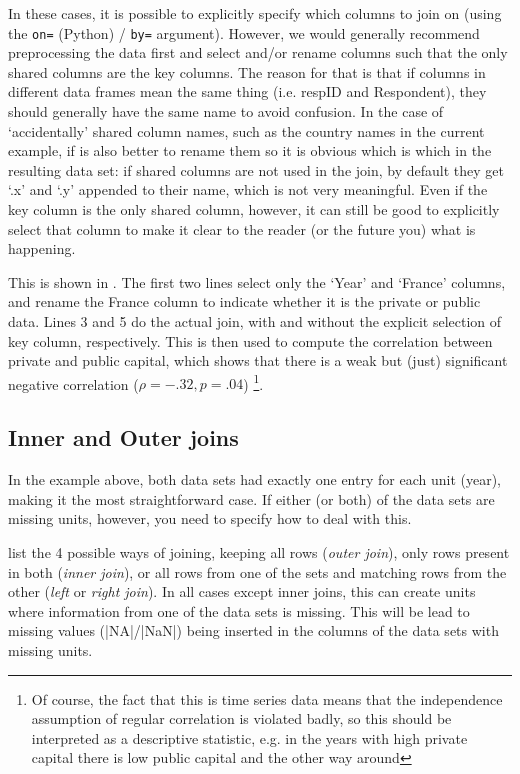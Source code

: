 In these cases, it is possible to explicitly specify which columns to join on (using the \verb+on=+ (Python) / \verb+by=+ argument).
However, we would generally recommend preprocessing the data first and select and/or rename columns such that the only shared columns are the key columns.
The reason for that is that if columns in different data frames mean the same thing (i.e. respID and Respondent), they should generally have the same name to avoid confusion.
In the case of `accidentally' shared column names, such as the country names in the current example,
if is also better to rename them so it is obvious which is which in the resulting data set:
if shared columns are not used in the join, by default they get `.x' and `.y' appended to their name, which is not very meaningful.
Even if the key column is the only shared column, however, it can still be good to explicitly select that column to make it clear to the reader (or the future you) what is happening. 


This is shown in .
The first two lines select only the `Year' and `France' columns, and rename the France column to indicate whether it is the private or public data.
Lines 3 and 5 do the actual join, with and without the explicit selection of key column, respectively.
This is then used to compute the correlation between private and public capital, 
which shows that there is a weak but (just) significant negative correlation ($\rho=-.32, p=.04$)%
\footnote{Of course, the fact that this is time series data means that the independence assumption of regular correlation is violated badly, so this should be interpreted as a descriptive statistic, e.g. in the years with high private capital there is low public capital and the other way around}.

\subsection{Inner and Outer joins}

In the example above, both data sets had exactly one entry for each unit (year), making it the most straightforward case.
If either (or both) of the data sets are missing units, however, you need to specify how to deal with this.

 list the 4 possible ways of joining, keeping all rows (\emph{outer join}), only rows present in both (\emph{inner join}), or all rows from one of the sets and matching rows from the other (\emph{left} or \emph{right join}).
In all cases except inner joins, this can create units where information from one of the data sets is missing.
This will be lead to missing values (|NA|/|NaN|) being inserted in the columns of the data sets with missing units.


